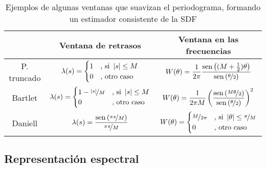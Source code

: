 \begin{table}
\centering
\begin{tabular}{c||c|c}
 & Ventana de retrasos & Ventana en las frecuencias \\
 \hline
  \hline
P. truncado & 
$\displaystyle
\lambda(s) = \begin{cases}
1 &\text{, si } \left| s \right| \leq M \\
0 &\text{, otro caso}
\end{cases}$ &
$\displaystyle
W(\theta) = \frac{1}{2\pi} \frac{\mathrm{sen}\left( (M+\frac{1}{2})\theta \right)}{\mathrm{sen}\left( \nicefrac{\theta}{2} \right)}$
\\
 \hline
Bartlet &
$\displaystyle
\lambda(s) = \begin{cases}
1-\nicefrac{\left| s \right|}{M} &\text{, si } \left| s \right| \leq M \\
0 &\text{, otro caso}
\end{cases}$ &
$\displaystyle
W(\theta) = \frac{1}{2\pi M} 
\left( \frac{\mathrm{sen}\left(  \nicefrac{M\theta}{2} \right)}{\mathrm{sen}\left( \nicefrac{\theta}{2} \right)} \right)^{2}$
\\
 \hline
Daniell &
$\displaystyle
\lambda(s) = \frac{\mathrm{sen}\left( \nicefrac{\pi s}{M} \right)}{\nicefrac{\pi s}{M}}$ &
$\displaystyle
W(\theta) = \begin{cases}
\nicefrac{M}{2\pi} &\text{, si } \left| \theta \right| \leq \nicefrac{\pi}{M} \\
0 &\text{, otro caso}
\end{cases}$
\end{tabular}
\caption{Ejemplos de algunas ventanas que suavizan el periodograma, formando
un estimador consistente de la SDF}
\label{ventanas}
\end{table}



\subsection{Representaci\'on espectral}

